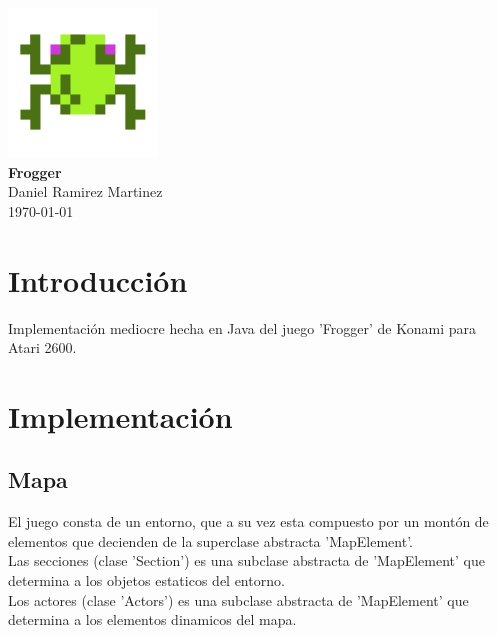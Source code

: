 \documentclass[letter, 12pt] {article}
\begin{document}
\begin {titlepage}
  \begin {center}
    \includegraphics[width=150px] {./img/Icon.png} \\[.7cm]
    { \Huge \bfseries Frogger } \\[.4cm]  %
    \Large Daniel Ramirez Martinez \\[.2cm]
    \large \today
  \end {center}
\end {titlepage}

\section* {Introducción} %
Implementación mediocre hecha en Java del juego 'Frogger' de Konami 
para Atari 2600. \\[1cm]


\section* {Implementación}  %
\subsection* {Mapa} %
El juego consta de un entorno, que a su vez esta compuesto por un
montón de elementos que decienden de la superclase abstracta
'MapElement'.\\

Las secciones (clase 'Section') es una subclase abstracta de 
'MapElement' que determina a los objetos estaticos del entorno.\\

Los actores (clase 'Actors') es una subclase abstracta de 'MapElement'
que determina a los elementos dinamicos del mapa.\\
\end{document}
